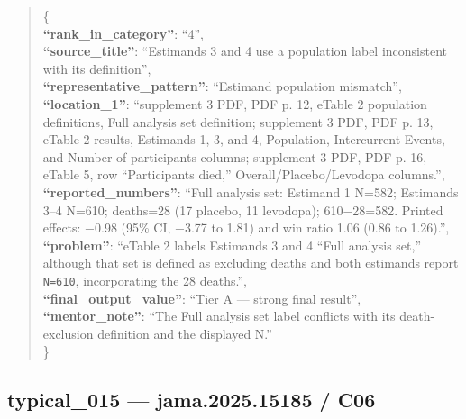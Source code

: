 \documentclass[
  letterpaper,
  9pt]{extreport}
\begin{document}
\begin{quote}
\{\\
\textbf{``rank\_in\_category''}: ``4'',\\
\textbf{``source\_title''}: ``Estimands 3 and 4 use a population label
inconsistent with its definition'',\\
\textbf{``representative\_pattern''}: ``Estimand population
mismatch'',\\
\textbf{``location\_1''}: ``supplement 3 PDF, PDF p. 12, eTable 2
population definitions, Full analysis set definition; supplement 3 PDF,
PDF p. 13, eTable 2 results, Estimands 1, 3, and 4, Population,
Intercurrent Events, and Number of participants columns; supplement 3
PDF, PDF p. 16, eTable 5, row ``Participants died,''
Overall/Placebo/Levodopa columns.'',\\
\textbf{``reported\_numbers''}: ``Full analysis set: Estimand 1 N=582;
Estimands 3--4 N=610; deaths=28 (17 placebo, 11 levodopa); 610−28=582.
Printed effects: −0.98 (95\% CI, −3.77 to 1.81) and win ratio 1.06 (0.86
to 1.26).'',\\
\textbf{``problem''}: ``eTable 2 labels Estimands 3 and 4 ``Full
analysis set,'' although that set is defined as excluding deaths and
both estimands report \texttt{N=610}, incorporating the 28 deaths.'',\\
\textbf{``final\_output\_value''}: ``Tier A --- strong final result'',\\
\textbf{``mentor\_note''}: ``The Full analysis set label conflicts with
its death-exclusion definition and the displayed N.''\\
\}
\end{quote}

\hypertarget{typical_015--jama202515185--c06}{%
\subsection{typical\_015 --- jama.2025.15185 /
C06}\label{typical_015--jama202515185--c06}}
\end{document}
